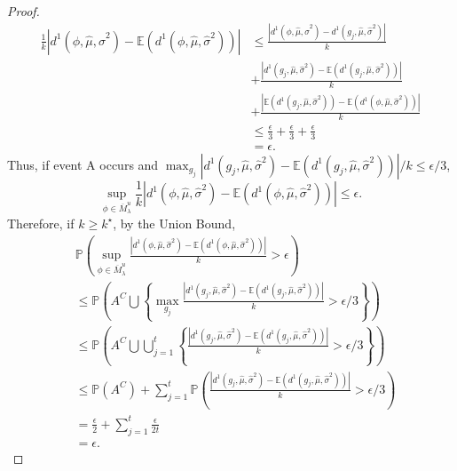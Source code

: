 \documentclass[12pt]{article}
\begin{document}
\begin{proof}
\begin{equation*}
\begin{split}
           \frac{1}{k}\left |d^1(\phi,\hat{\mu},\hat{\sigma}^2)-\mathbb{E}\left ( d^1(\phi,\hat{\mu},\hat{\sigma}^2)\right )\right |&\leq \frac{ \left |d^1(\phi,\hat{\mu},\hat{\sigma}^2)-d^1(g_j,\hat{\mu},\hat{\sigma}^2) \right |}{k} \\
           & +\frac{\left | d^1(g_j,\hat{\mu},\hat{\sigma}^2)-\mathbb{E}\left ( d^1(g_j,\hat{\mu},\hat{\sigma}^2)\right ) \right |}{k}\\
           & +\frac{\left |\mathbb{E}\left ( d^1(g_j,\hat{\mu},\hat{\sigma}^2)\right )-\mathbb{E}\left ( d^1(\phi,\hat{\mu},\hat{\sigma}^2)\right ) \right |}{k}\\
           &\leq \frac{\epsilon}{3}+\frac{\epsilon}{3}+\frac{\epsilon}{3}\\
           &= \epsilon.
        \end{split}
    \end{equation*}
    Thus, if event A occurs and $\max_{g_j}\left | d^1(g_j,\hat{\mu},\hat{\sigma}^2)-\mathbb{E}\left ( d^1(g_j,\hat{\mu},\hat{\sigma}^2)\right ) \right |/k\leq \epsilon/3$,
    $$\sup_{\phi \in \overline{M}^u_\lambda}\frac{1}{k}\left |d^1(\phi,\hat{\mu},\hat{\sigma}^2)-\mathbb{E}\left ( d^1(\phi,\hat{\mu},\hat{\sigma}^2)\right )\right | \leq \epsilon.$$
    Therefore, if $k\geq k^\star$, by the Union Bound,
    \begin{equation*}
        \begin{split}
            & \mathbb{P}\left (\sup_{\phi \in \overline{M}^u_\lambda}\frac{|d^1(\phi,\hat{\mu},\hat{\sigma}^2)-\mathbb{E}\left ( d^1(\phi,\hat{\mu},\hat{\sigma}^2)\right )|}{k}>\epsilon\right )\\
            &\leq \mathbb{P}\left ( A^C \bigcup \left \{\max_{g_j} \frac{\left | d^1(g_j,\hat{\mu},\hat{\sigma}^2)-\mathbb{E}\left ( d^1(g_j,\hat{\mu},\hat{\sigma}^2)\right ) \right |}{k}> \epsilon/3 \right \} \right )\\
            & \leq \mathbb{P}\left ( A^C\bigcup  \bigcup_{j=1}^t \left \{ \frac{\left | d^1(g_j,\hat{\mu},\hat{\sigma}^2)-\mathbb{E}\left ( d^1(g_j,\hat{\mu},\hat{\sigma}^2)\right ) \right |}{k}> \epsilon/3 \right \} \right )\\
            &\leq \mathbb{P}\left (A^C \right )+\sum_{j=1}^t \mathbb{P}\left ( \frac{\left | d^1(g_j,\hat{\mu},\hat{\sigma}^2)-\mathbb{E}\left ( d^1(g_j,\hat{\mu},\hat{\sigma}^2)\right ) \right |}{k}> \epsilon/3 \right )\\
            &=\frac{\epsilon}{2}+\sum_{j=1}^t \frac{\epsilon}{2t} \\
            &= \epsilon.
        \end{split}
    \end{equation*}
\end{proof}
\end{document}
